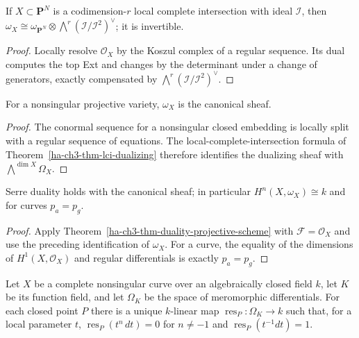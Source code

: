 \begin{theorem}\label{ha-ch3-thm-lci-dualizing}
If $X\subset\mathbf P^N$ is a codimension-$r$ local complete intersection with
ideal $\mathcal I$, then
$\omega_X\cong\omega_{\mathbf P^N}\otimes\bigwedge^r(\mathcal I/\mathcal I^2)^\vee$;
it is invertible.
\end{theorem}
\begin{proof}
Locally resolve $\mathcal O_X$ by the Koszul complex of a
regular sequence.  Its dual computes the top Ext and changes by the
determinant under a change of generators, exactly compensated by
$\bigwedge^r(\mathcal I/\mathcal I^2)^\vee$.
\end{proof}
\begin{corollary}\label{ha-ch3-cor-nonsingular-duality}
For a nonsingular projective variety, $\omega_X$ is the canonical sheaf.
\end{corollary}
\begin{proof}

The conormal sequence for a nonsingular closed embedding is locally split with a regular sequence of
equations.  The local-complete-intersection formula of Theorem~\ref{ha-ch3-thm-lci-dualizing}
therefore identifies the dualizing sheaf with $\bigwedge^{\dim X}\Omega_X$.

\end{proof}
\begin{corollary}\label{ha-ch3-cor-serre-nonsingular}
Serre duality holds with the canonical sheaf; in particular
$H^n(X,\omega_X)\cong k$ and for curves $p_a=p_g$.
\end{corollary}
\begin{proof}

Apply Theorem~\ref{ha-ch3-thm-duality-projective-scheme} with $\mathcal F=\mathcal O_X$ and use
the preceding identification of $\omega_X$.  For a curve, the equality of the dimensions of
$H^1(X,\mathcal O_X)$ and regular differentials is exactly $p_a=p_g$.

\end{proof}
\begin{theorem}\label{ha-ch3-thm-residues-existence}
Let $X$ be a complete nonsingular curve over an algebraically closed field
$k$, let $K$ be its function field, and let $\Omega_K$ be the space of
meromorphic differentials.  For each closed point $P$ there is a unique
$k$-linear map $\operatorname{res}_P:\Omega_K\to k$ such that, for a local
parameter $t$, $\operatorname{res}_P(t^n\,dt)=0$ for $n\ne-1$ and
$\operatorname{res}_P(t^{-1}dt)=1$.

\end{theorem}

